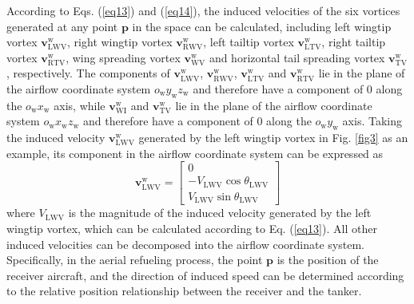 According to Eqs. (\ref{eq13}) and (\ref{eq14}), the induced velocities of the six vortices generated at any point $\mathbf{p}$ in the space can be calculated, including left wingtip vortex $\mathbf{v}^\mathrm{w}_\mathrm{LWV}$, right wingtip vortex $\mathbf{v}^\mathrm{w}_\mathrm{RWV}$, left tailtip vortex $\mathbf{v}^\mathrm{w}_\mathrm{LTV}$, right tailtip vortex $\mathbf{v}^\mathrm{w}_\mathrm{RTV}$, wing spreading vortex $\mathbf{v}^\mathrm{w}_\mathrm{WV}$ and horizontal tail spreading vortex $\mathbf{v}^\mathrm{w}_\mathrm{TV}$, respectively. The components of $\mathbf{v}^\mathrm{w}_\mathrm{LWV}$, $\mathbf{v}^\mathrm{w}_\mathrm{RWV}$, $\mathbf{v}^\mathrm{w}_\mathrm{LTV}$ and $\mathbf{v}^\mathrm{w}_\mathrm{RTV}$ lie in the plane of the airflow coordinate system ${o}_\mathrm{w}{y}_\mathrm{w}{z}_\mathrm{w}$ and therefore have a component of 0 along the $o_\mathrm{w}x_\mathrm{w}$ axis, while $\mathbf{v}_\mathrm{WI}^\mathrm{w}$ and $\mathbf{v}_\mathrm{TV}^\mathrm{w}$ lie in the plane of the airflow coordinate system ${o}_\mathrm{w}{x}_\mathrm{w}{z}_\mathrm{w}$ and therefore have a component of 0 along the ${o}_\mathrm{w}{y}_\mathrm{w}$ axis. Taking the induced velocity $\mathbf{v}^\mathrm{w}_\mathrm{LWV}$ generated by the left wingtip vortex in Fig. \ref{fig3} as an example, its component in the airflow coordinate system can be expressed as
\begin{equation}\label{eq15}
\mathbf{v}_{\mathrm{LWV}}^{\mathrm{w}}=\left[\begin{array}{c}
0 \\
-V_{\mathrm{LWV}} \cos \theta_{\mathrm{LWV}} \\
V_{\mathrm{LWV}} \sin \theta_{\mathrm{LWV}}
\end{array}\right]
\end{equation}
where $V_\mathrm{LWV}$ is the magnitude of the induced velocity generated by the left wingtip vortex, which can be calculated according to Eq. (\ref{eq13}). All other induced velocities can be decomposed into the airflow coordinate system. Specifically, in the aerial refueling process, the point $\mathbf{p}$ is the position of the receiver aircraft, and the direction of induced speed can be determined according to the relative position relationship between the receiver and the tanker.

